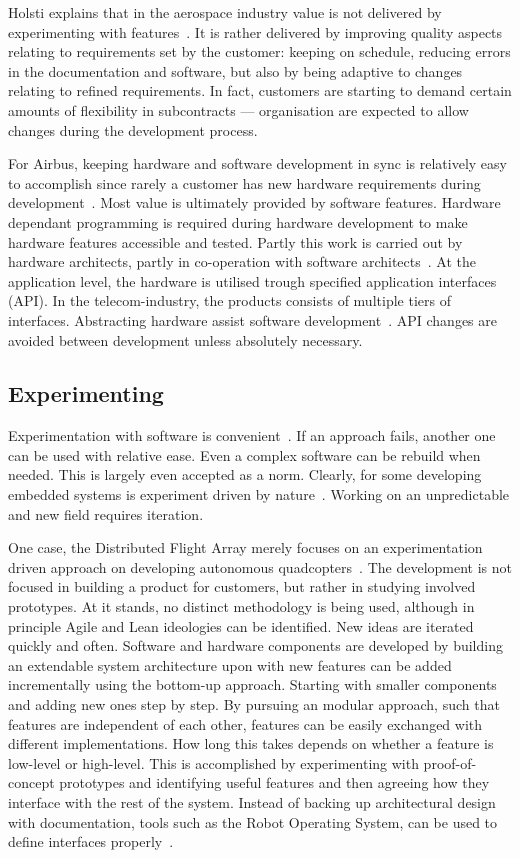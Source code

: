 \documentclass[english]{tktltiki2}
\begin{document}
Holsti explains that in the aerospace industry value is not delivered by experimenting with features~\cite{Hol15b}. It is rather delivered by improving quality aspects relating to requirements set by the customer: keeping on schedule, reducing errors in the documentation and software, but also by being adaptive to changes relating to refined requirements. In fact, customers are starting to demand certain amounts of flexibility in subcontracts — organisation are expected to allow changes during the development process.

For Airbus, keeping hardware and software development in sync is relatively easy to accomplish since rarely a customer has new hardware requirements during development~\cite{Koi15}. Most value is ultimately provided by software features. Hardware dependant programming is required during hardware development to make hardware features accessible and tested. Partly this work is carried out by hardware architects, partly in co-operation with software architects~\cite{Koi15}. At the application level, the hardware is utilised trough specified application interfaces (API). In the telecom-industry, the products consists of multiple tiers of interfaces. Abstracting hardware assist software development~\cite{Koi15}. API changes are avoided between development unless absolutely necessary.

\subsection{Experimenting}

Experimentation with software is convenient~\cite{Hol15a}. If an approach fails, another one can be used with relative ease. Even a complex software can be rebuild when needed. This is largely even accepted as a norm. Clearly, for some developing embedded systems is experiment driven by nature~\cite{Hol15a, Kri15}. Working on an unpredictable and new field requires iteration.

One case, the Distributed Flight Array merely focuses on an experimentation driven approach on developing autonomous quadcopters~\cite{Kri15}. The development is not focused in building a product for customers, but rather in studying involved prototypes. At it stands, no distinct methodology is being used, although in principle Agile and Lean ideologies can be identified. New ideas are iterated quickly and often. Software and hardware components are developed by building an extendable system architecture upon with new features can be added incrementally using the bottom-up approach. Starting with smaller components and adding new ones step by step. By pursuing an modular approach, such that features are independent of each other, features can be easily exchanged with different implementations. How long this takes depends on whether a feature is low-level or high-level. This is accomplished by experimenting with proof-of-concept prototypes and identifying useful features and then agreeing how they interface with the rest of the system. Instead of backing up architectural design with documentation, tools such as the Robot Operating System, can be used to define interfaces properly~\cite{ROS}.
\end{document}
